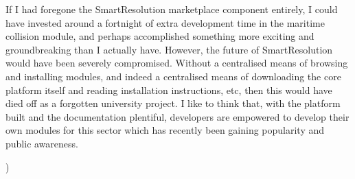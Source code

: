 If I had foregone the SmartResolution marketplace component entirely, I could have invested around a fortnight of extra development time in the maritime collision module, and perhaps accomplished something more exciting and groundbreaking than I actually have. However, the future of SmartResolution would have been severely compromised. Without a centralised means of browsing and installing modules, and indeed a centralised means of downloading the core platform itself and reading installation instructions, etc, then this would have died off as a forgotten university project. I like to think that, with the platform built and the documentation plentiful, developers are empowered to develop their own modules for this sector which has recently been gaining popularity and public awareness.

)